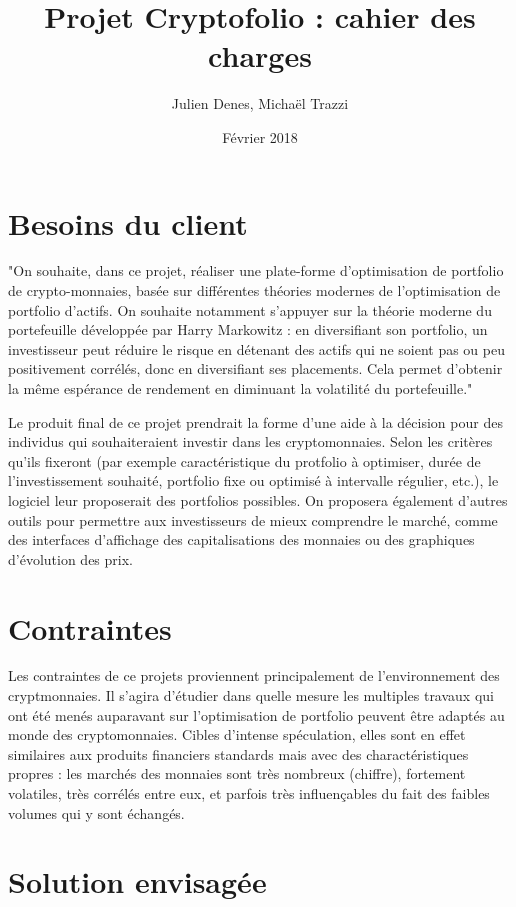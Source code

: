 \documentclass[a4paper]{article}
\title{Projet Cryptofolio : cahier des charges}
\author{Julien Denes, Michaël Trazzi}
\date{Février 2018}
\begin{document}
\maketitle

\section{Besoins du client}

"On souhaite, dans ce projet, réaliser une plate-forme d’optimisation de portfolio de crypto-monnaies, basée sur différentes théories modernes de l'optimisation de portfolio d'actifs. On souhaite notamment s'appuyer sur la théorie moderne du portefeuille développée par Harry Markowitz : en diversifiant son portfolio, un investisseur peut réduire le risque en détenant des actifs qui ne soient pas ou peu positivement corrélés, donc en diversifiant ses placements. Cela permet d'obtenir la même espérance de rendement en diminuant la volatilité du portefeuille."

Le produit final de ce projet prendrait la forme d'une aide à la décision pour des individus qui souhaiteraient investir dans les cryptomonnaies. Selon les critères qu'ils fixeront (par exemple caractéristique du protfolio à optimiser, durée de l'investissement souhaité, portfolio fixe ou optimisé à intervalle régulier, etc.), le logiciel leur proposerait des portfolios possibles. On proposera également d'autres outils pour permettre aux investisseurs de mieux comprendre le marché, comme des interfaces d'affichage des capitalisations des monnaies ou des graphiques d'évolution des prix.

\section{Contraintes}

Les contraintes de ce projets proviennent principalement de l'environnement des cryptmonnaies. Il s'agira d'étudier dans quelle mesure les multiples travaux qui ont été menés auparavant sur l'optimisation de portfolio peuvent être adaptés au monde des cryptomonnaies. Cibles d'intense spéculation, elles sont en effet similaires aux produits financiers standards mais avec des charactéristiques propres : les marchés des monnaies sont très nombreux (chiffre), fortement volatiles, très corrélés entre eux, et parfois très influençables du fait des faibles volumes qui y sont échangés.

\section{Solution envisagée}
\end{document}
